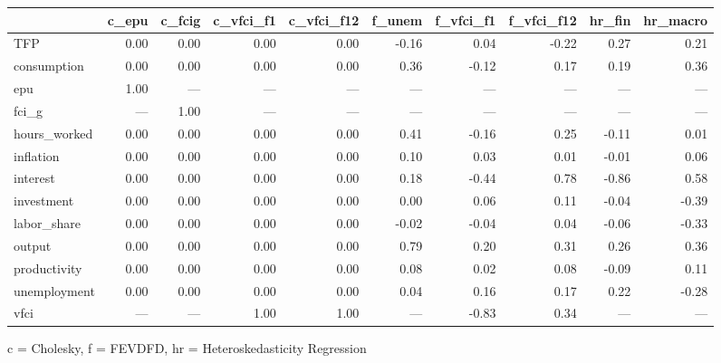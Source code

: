 
\fontsize{12.0pt}{14.4pt}\selectfont
\begin{tabular*}{\linewidth}{@{\extracolsep{\fill}}l|rrrrrrrrr}
\toprule
 & c\_epu & c\_fcig & c\_vfci\_f1 & c\_vfci\_f12 & f\_unem & f\_vfci\_f1 & f\_vfci\_f12 & hr\_fin & hr\_macro \\ 
\midrule\addlinespace[2.5pt]
TFP & 0.00 & 0.00 & 0.00 & 0.00 & -0.16 & 0.04 & -0.22 & 0.27 & 0.21 \\ 
consumption & 0.00 & 0.00 & 0.00 & 0.00 & 0.36 & -0.12 & 0.17 & 0.19 & 0.36 \\ 
epu & 1.00 & — & — & — & — & — & — & — & — \\ 
fci\_g & — & 1.00 & — & — & — & — & — & — & — \\ 
hours\_worked & 0.00 & 0.00 & 0.00 & 0.00 & 0.41 & -0.16 & 0.25 & -0.11 & 0.01 \\ 
inflation & 0.00 & 0.00 & 0.00 & 0.00 & 0.10 & 0.03 & 0.01 & -0.01 & 0.06 \\ 
interest & 0.00 & 0.00 & 0.00 & 0.00 & 0.18 & -0.44 & 0.78 & -0.86 & 0.58 \\ 
investment & 0.00 & 0.00 & 0.00 & 0.00 & 0.00 & 0.06 & 0.11 & -0.04 & -0.39 \\ 
labor\_share & 0.00 & 0.00 & 0.00 & 0.00 & -0.02 & -0.04 & 0.04 & -0.06 & -0.33 \\ 
output & 0.00 & 0.00 & 0.00 & 0.00 & 0.79 & 0.20 & 0.31 & 0.26 & 0.36 \\ 
productivity & 0.00 & 0.00 & 0.00 & 0.00 & 0.08 & 0.02 & 0.08 & -0.09 & 0.11 \\ 
unemployment & 0.00 & 0.00 & 0.00 & 0.00 & 0.04 & 0.16 & 0.17 & 0.22 & -0.28 \\ 
vfci & — & — & 1.00 & 1.00 & — & -0.83 & 0.34 & — & — \\ 
\bottomrule
\end{tabular*}
\begin{minipage}{\linewidth}
c = Cholesky, f = FEVDFD, hr = Heteroskedasticity Regression\\
\end{minipage}


